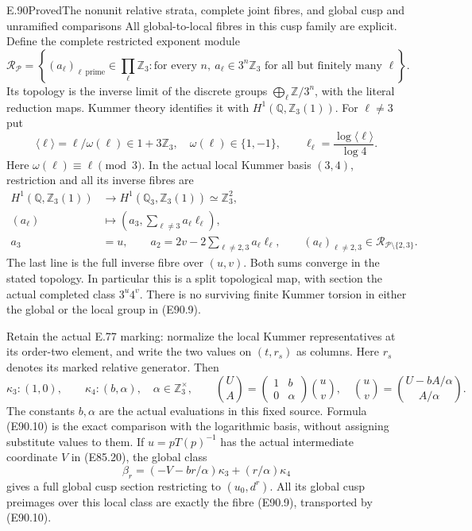 \begin{statement}{E.90}{Proved}{The nonunit relative strata, complete joint fibres, and global cusp and unramified comparisons}
All global-to-local fibres in this cusp family
are explicit. Define the complete restricted
exponent module
\[
 \mathscr R_{\mathcal P}=
 \left\{(a_\ell)_{\ell\ \mathrm{prime}}\in\prod_\ell\mathbb Z_3:
  \text{for every }n,\ a_\ell\in3^n\mathbb Z_3
                    \text{ for all but finitely many }\ell\right\}.
 \tag{E90.7}
\]
Its topology is the inverse limit of the discrete
groups $\bigoplus_\ell\mathbb Z/3^n$, with the
literal reduction maps. Kummer theory identifies
it with $H^1(\mathbb Q,\mathbb Z_3(1))$.
For $\ell\ne3$ put
\[
  \langle\ell\rangle=\ell/\omega(\ell)\in1+3\mathbb Z_3,
  \quad\omega(\ell)\in\{1,-1\},\qquad
  \ell_\ell=\frac{\log\langle\ell\rangle}{\log4}.
 \tag{E90.8}
\]
Here $\omega(\ell)\equiv\ell\pmod3$.
In the actual local Kummer basis $(3,4)$,
restriction and all its inverse fibres are
\[
\begin{aligned}
 H^1(\mathbb Q,\mathbb Z_3(1))&\longrightarrow
 H^1(\mathbb Q_3,\mathbb Z_3(1))\simeq\mathbb Z_3^2,\\
 (a_\ell)&\longmapsto
      \left(a_3,\sum_{\ell\ne3}a_\ell\ell_\ell\right),\\
 a_3&=u,\qquad
 a_2=2v-2\sum_{\ell\ne2,3}a_\ell\ell_\ell,
       \qquad(a_\ell)_{\ell\ne2,3}\in\mathscr R_{\mathcal P\setminus\{2,3\}}.
\end{aligned}
 \tag{E90.9}
\]
The last line is the full inverse fibre over $(u,v)$.
Both sums converge in the stated topology.
In particular this is a split topological map,
with section the actual completed class $3^u4^v$.
There is no surviving finite Kummer torsion in
either the global or the local group in (E90.9).

Retain the actual E.77 marking: normalize the local
Kummer representatives at its order-two element,
and write the two values on $(t,r_s)$ as columns.
Here $r_s$ denotes its marked relative generator.
Then
\[
 \kappa_3:(1,0),\qquad
 \kappa_4:(b,\alpha),\quad\alpha\in\mathbb Z_3^\times,
 \qquad
 \binom{U}{A}=
    \begin{pmatrix}1&b\\0&\alpha\end{pmatrix}\binom{u}{v},
 \quad
 \binom{u}{v}=
    \binom{U-bA/\alpha}{A/\alpha}.
 \tag{E90.10}
\]
The constants $b,\alpha$ are the actual evaluations
in this fixed source. Formula (E90.10) is the
exact comparison with the logarithmic basis,
without assigning substitute values to them.
If $u=pT(p)^{-1}$ has the actual intermediate
coordinate $V$ in (E85.20), the global class
\[
       \beta_r=(-V-br/\alpha)\kappa_3+(r/\alpha)\kappa_4
 \tag{E90.11}
\]
gives a full global cusp section restricting
to $(u_0,d^r)$. All its global cusp preimages
over this local class are exactly the fibre
(E90.9), transported by (E90.10).


\end{statement}
